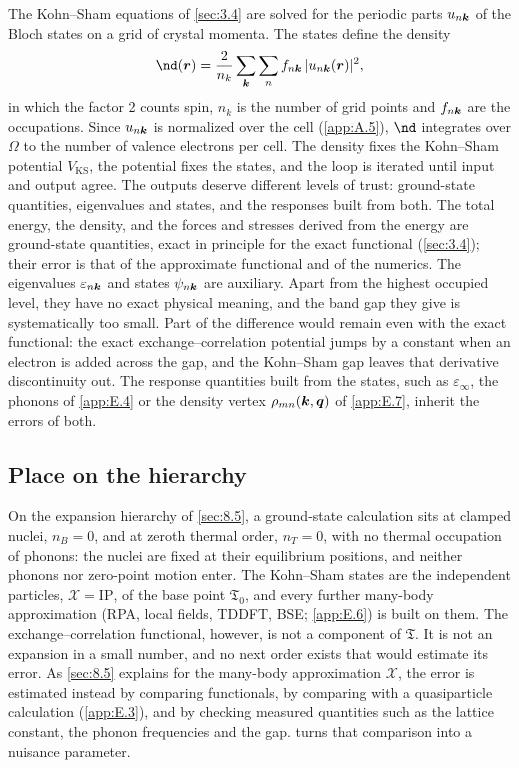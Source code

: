 The Kohn--Sham equations of \cref{sec:3.4} are solved for the periodic parts $u_{n\bm{k}}$ of the Bloch states on a grid of crystal momenta. The states define the density
\begin{equation}
  \nd(\vect{r}) = \frac{2}{n_k}\sum_{\vect{k}}\sum_{n}f_{n\vect{k}}\,|u_{n\vect{k}}(\vect{r})|^2 ,
  \label{eq:E.1-density}
\end{equation}
in which the factor 2 counts spin, $n_k$ is the number of grid points and $f_{n\bm{k}}$ are the occupations. Since $u_{n\bm{k}}$ is normalized over the cell (\cref{app:A.5}), $\nd$ integrates over $\Omega$ to the number of valence electrons per cell. The density fixes the Kohn--Sham potential $V_{\mathrm{KS}}$, the potential fixes the states, and the loop is iterated until input and output agree. The outputs deserve different levels of trust: ground-state quantities, eigenvalues and states, and the responses built from both. The total energy, the density, and the forces and stresses derived from the energy are ground-state quantities, exact in principle for the exact functional (\cref{sec:3.4}); their error is that of the approximate functional and of the numerics. The eigenvalues $\varepsilon_{n\bm{k}}$ and states $\psi_{n\bm{k}}$ are auxiliary. Apart from the highest occupied level, they have no exact physical meaning, and the band gap they give is systematically too small. Part of the difference would remain even with the exact functional: the exact exchange--correlation potential jumps by a constant when an electron is added across the gap, and the Kohn--Sham gap leaves that derivative discontinuity out. The response quantities built from the states, such as $\varepsilon_\infty$, the phonons of \cref{app:E.4} or the density vertex $\rho_{mn}(\bm{k}, \bm{q})$ of \cref{app:E.7}, inherit the errors of both.

\subsection{Place on the hierarchy}

On the expansion hierarchy of \cref{sec:8.5}, a ground-state calculation sits at clamped nuclei, $n_B = 0$, and at zeroth thermal order, $n_T = 0$, with no thermal occupation of phonons: the nuclei are fixed at their equilibrium positions, and neither phonons nor zero-point motion enter. The Kohn--Sham states are the independent particles, $\mathcal{X} = \mathrm{IP}$, of the base point $\mathfrak{T}_0$, and every further many-body approximation (RPA, local fields, TDDFT, BSE; \cref{app:E.6}) is built on them. The exchange--correlation functional, however, is not a component of $\mathfrak{T}$. It is not an expansion in a small number, and no next order exists that would estimate its error. As \cref{sec:8.5} explains for the many-body approximation $\mathcal{X}$, the error is estimated instead by comparing functionals, by comparing with a quasiparticle calculation (\cref{app:E.3}), and by checking measured quantities such as the lattice constant, the phonon frequencies and the gap.  turns that comparison into a nuisance parameter.

